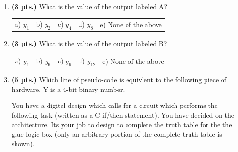 \documentclass{article}
\begin{document}
\begin{enumerate}
\item {\bf (3 pts.)} What is the value of the output labeled A?

\begin{tabular}{p{0.6in} p{0.6in} p{0.6in} p{0.6in} l}
a) $y_{1}$ & b) $y_{2}$ & c) $y_{4}$ & d) $y_{8}$ & e) None of the above
\end{tabular}

\item {\bf (3 pts.)} What is the value of the output labeled B?

\begin{tabular}{p{0.6in} p{0.6in} p{0.6in} p{0.6in} l}
a) $y_{1}$ & b) $y_{6}$ & c) $y_{9}$ & d) $y_{12}$ & e) None of the above
\end{tabular}


\item {\bf (5 pts.)} Which line of pseudo-code is equivlent to 
the following piece of hardware.  Y is a 4-bit binary number.



\pagebreak
You have a digital design which calls for a circuit which performs the 
following task (written as a C if/then statement).  You have decided on 
the architecture.  Its your job to design to complete the truth table
for the the glue-logic box (only an arbitrary portion of the complete 
truth table is shown).  


\end{enumerate}
\end{document}
